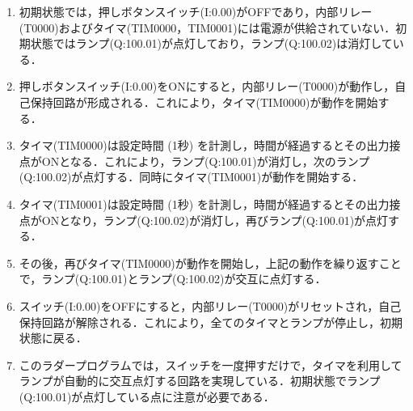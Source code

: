 \begin{enumerate}
  \item 初期状態では，押しボタンスイッチ(I:0.00)がOFFであり，内部リレー(T0000)およびタイマ(TIM0000，TIM0001)には電源が供給されていない．初期状態ではランプ(Q:100.01)が点灯しており，ランプ(Q:100.02)は消灯している．
  \item 押しボタンスイッチ(I:0.00)をONにすると，内部リレー(T0000)が動作し，自己保持回路が形成される．これにより，タイマ(TIM0000)が動作を開始する．
  \item タイマ(TIM0000)は設定時間 (1秒) を計測し，時間が経過するとその出力接点がONとなる．これにより，ランプ(Q:100.01)が消灯し，次のランプ(Q:100.02)が点灯する．同時にタイマ(TIM0001)が動作を開始する．
  \item タイマ(TIM0001)は設定時間 (1秒) を計測し，時間が経過するとその出力接点がONとなり，ランプ(Q:100.02)が消灯し，再びランプ(Q:100.01)が点灯する．
  \item その後，再びタイマ(TIM0000)が動作を開始し，上記の動作を繰り返すことで，ランプ(Q:100.01)とランプ(Q:100.02)が交互に点灯する．
  \item スイッチ(I:0.00)をOFFにすると，内部リレー(T0000)がリセットされ，自己保持回路が解除される．これにより，全てのタイマとランプが停止し，初期状態に戻る．
  \item このラダープログラムでは，スイッチを一度押すだけで，タイマを利用してランプが自動的に交互点灯する回路を実現している．初期状態でランプ(Q:100.01)が点灯している点に注意が必要である．
\end{enumerate}



